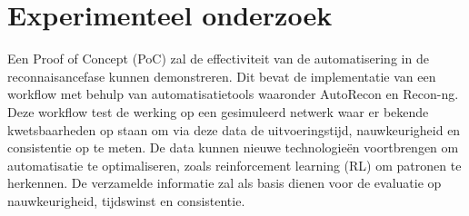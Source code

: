 \section{Experimenteel onderzoek}

Een Proof of Concept (PoC) zal de effectiviteit van de automatisering in de reconnaisancefase kunnen demonstreren.
Dit bevat de implementatie van een workflow met behulp van automatisatietools waaronder AutoRecon en Recon-ng. 
Deze workflow test de werking op een gesimuleerd netwerk waar er bekende kwetsbaarheden op staan om via deze data de uitvoeringstijd,
nauwkeurigheid en consistentie op te meten. De data kunnen nieuwe technologieën voortbrengen om automatisatie te optimaliseren,
zoals reinforcement learning (RL) om patronen te herkennen.
De verzamelde informatie zal als basis dienen voor de evaluatie op nauwkeurigheid, tijdswinst en consistentie.







